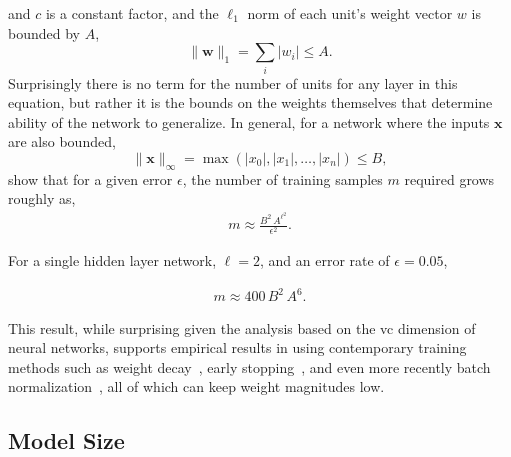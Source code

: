 \documentclass[thesis]{subfiles}
\begin{document}
    and $c$ is a constant factor, and the $\ell_1$ norm of each unit's weight vector $w$ is bounded by $A$, 
    \begin{equation}
    \|\mathbf{w}\|_1 = \sum_i | w_i | \leq A.
    \end{equation}
    Surprisingly there is no term for the number of units for any layer in this equation, but rather it is the bounds on the weights themselves that determine ability of the network to generalize. In general, for a network where the inputs $\mathbf{x}$ are also bounded,
    \begin{equation}
        \|\mathbf{x}\|_\infty = \max(|x_0|, |x_1|, \ldots, |x_n|) \leq B,
    \end{equation}
    \citet{bartlett1997} show that for a given error $\epsilon$, the number of training samples $m$ required grows roughly as,
    \begin{align}
        m \approx \frac{B^2\,A^{\ell^2}}{\epsilon^2}.
    \end{align}
    
     For a single hidden layer network, \ie $\ell=2$, and an error rate of $\epsilon=0.05$, 
    
    \begin{align}
        m \approx 400\,B^2\,A^6.
    \end{align}
    
    This result, while surprising given the analysis based on the \gls{vc} dimension of neural networks, supports empirical results in using contemporary training methods such as weight decay~\citep{hinton1987learning}, early stopping~\citep{Bishop1995}, and even more recently batch normalization~\citep{Ioffe2015}, all of which can keep weight magnitudes low.
    
	
    \subsection{Model Size}
    
\end{document}

